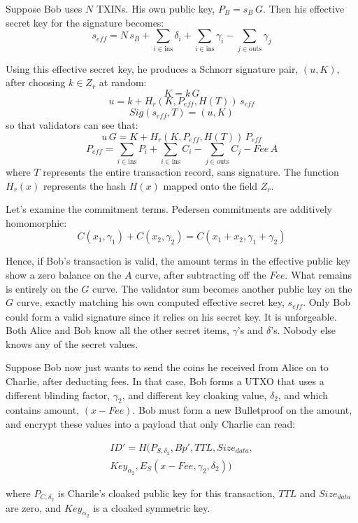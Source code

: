\documentclass[8pt,fleqn,openany]{book}
\begin{document}
Suppose Bob uses $N$ TXINs. His own public key, $P_B = s_B \, G$. Then his effective secret key for the signature becomes:
$$s_{\mathit{eff}} = N \, s_B + \sum_{i \in \text{ins}} {\delta_i} + \sum_{i \in \text{ins}}{\gamma_i} - \sum_{j \in \text{outs}}{ \gamma_j}$$

Using this effective secret key, he produces a Schnorr signature pair, $(u, K)$, after choosing $k \in Z_r$ at random:
$$K = k \, G$$
$$u = k + H_r(K, P_{eff}, H(T)) \, s_{\mathit{eff}}$$
$$Sig(s_{eff},T) = (u, K)$$
so that validators can see that:
$$u \, G = K + H_r(K, P_{eff}, H(T)) \, P_{eff}$$
$$P_{\mathit{eff}} = \sum_{i \in \text{ins}}{P_i} + \sum_{i \in \text{ins}}{C_i} - \sum_{j \in \text{outs}}{C_j} - \mathit{Fee} \, A$$
where $T$ represents the entire transaction record, sans signature. The function $H_r(x)$ represents the hash $H(x)$ mapped onto the field $Z_r$.

Let's examine the commitment terms. Pedersen commitments are additively homomorphic:
$$C(x_1, \gamma_1) + C(x_2, \gamma_2) = C(x_1 + x_2, \gamma_1 + \gamma_2)$$

Hence, if Bob's transaction is valid, the amount terms in the effective public key show a zero balance on the $A$ curve, after subtracting off the $\mathit{Fee}$. What remains is entirely on the $G$ curve. The validator sum becomes another public key on the $G$ curve, exactly matching his own computed effective secret key, $s_{\mathit{eff}}$. Only Bob could form a valid signature since it relies on his secret key. It is unforgeable. Both Alice and Bob know all the other secret items, $\gamma$'s and $\delta$'s. Nobody else knows any of the secret values.

Suppose Bob now just wants to send the coins he received from Alice on to Charlie, after deducting fees. In that case, Bob forms a UTXO that uses a different blinding factor, $\gamma_2$, and different key cloaking value, $\delta_2$, and which contains amount, $(x - \mathit{Fee})$. Bob must form a new Bulletproof on the amount, and encrypt these values into a payload that only Charlie can read:

\begin{multline*}
ID' = H(P_{S, \delta_2}, Bp', TTL, Size_{data}, \\
          Key_{\alpha_2}, E_S(x - Fee, \gamma_2, \delta_2))
\end{multline*}

where $P_{C, \delta_2}$ is Charile's cloaked public key for this transaction, $TTL$ and $Size_{data}$ are zero, and $Key_{\alpha_2}$ is a cloaked symmetric key. 
\end{document}
